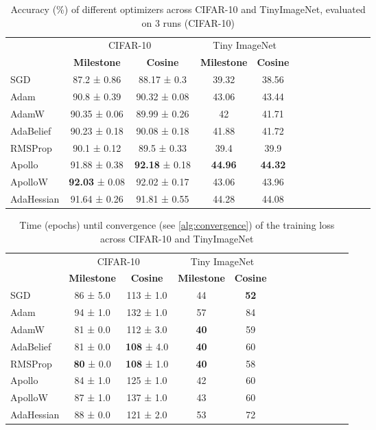 \begin{table}[h!]
    \centering
    \caption{Accuracy (\%) of different optimizers across CIFAR-10 and TinyImageNet, evaluated on 3 runs (CIFAR-10)}
    \label{tab:optimizer_comparison_acc}
    \begin{tabular}{lcccccccccccc}
        \toprule
        & \multicolumn{2}{c}{CIFAR-10} & \multicolumn{2}{c}{Tiny ImageNet} \\
        \cmidrule(lr){2-3} \cmidrule(lr){4-5}  \cmidrule(lr){6-7} 
        & \textbf{Milestone} & \textbf{Cosine}  & \textbf{Milestone} & \textbf{Cosine}    \\
        \midrule
        SGD         & 87.2 ± 0.86  & 88.17 ± 0.3 & 39.32  & 38.56  \\
        Adam        & 90.8 ± 0.39   & 90.32 ± 0.08  & 43.06 & 43.44    \\
        AdamW       & 90.35 ± 0.06  & 89.99 ± 0.26 & 42  & 41.71 \\
        AdaBelief   & 90.23 ± 0.18  & 90.08 ± 0.18 & 41.88 & 41.72 \\
        RMSProp     & 90.1 ± 0.12   & 89.5 ± 0.33  & 39.4 & 39.9\\
        Apollo      & 91.88 ± 0.38 & \textbf{92.18} ± 0.18  & \textbf{44.96}  & \textbf{44.32}    \\
        ApolloW     & \textbf{92.03} ± 0.08 & 92.02 ± 0.17  & 43.06  & 43.96  \\
        AdaHessian  & 91.64 ± 0.26    &  91.81 ± 0.55 &  44.28& 44.08  \\
        \bottomrule
    \end{tabular}
\end{table}

\begin{table}[h!]
    \centering
    \caption{Time (epochs) until convergence (see \ref{alg:convergence}) of the training loss across CIFAR-10 and TinyImageNet}
    \label{tab:optimizer_comparison_ttc}
    \begin{tabular}{lcccccccccccc}
        \toprule
        & \multicolumn{2}{c}{CIFAR-10} & \multicolumn{2}{c}{Tiny ImageNet} \\
        \cmidrule(lr){2-3} \cmidrule(lr){4-5}  \cmidrule(lr){6-7} 
        & \textbf{Milestone} & \textbf{Cosine}  & \textbf{Milestone} & \textbf{Cosine}    \\
        \midrule
        SGD         & 86 ± 5.0 & 113 ± 1.0 & 44 & \textbf{52} \\
        Adam        & 94 ± 1.0 & 132 ± 1.0& 57 & 84  \\
        AdamW       & 81 ± 0.0 & 112 ± 3.0& \textbf{40} & 59 \\
        AdaBelief   & 81 ± 0.0  &  \textbf{108} ± 4.0& \textbf{40} & 60 \\
        RMSProp     & \textbf{80} ± 0.0  & \textbf{108} ± 1.0& \textbf{40} & 58\\
        Apollo      & 84 ± 1.0 & 125 ± 1.0& 42 & 60   \\
        ApolloW     & 87 ± 1.0 & 137 ± 1.0& 43 & 60  \\
        AdaHessian  & 88 ± 0.0 & 121 ± 2.0& 53 & 72 \\
        \bottomrule
    \end{tabular}
\end{table}
